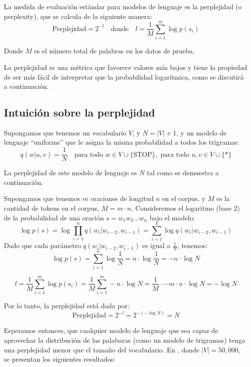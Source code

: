 \begin{definition}
La medida de evaluación estándar para modelos de lenguaje es la perplejidad (o perplexity), que se calcula de la siguiente manera:
\[
\text{Perplejidad} = 2^{-l} \quad \text{donde} \quad l = \frac{1}{M} \sum_{i=1}^{m} \log p(s_i)
\]

Donde $M$ es el número total de palabras en los datos de prueba. 
\end{definition}



La perplejidad es una métrica que favorece valores más bajos y tiene la propiedad de ser más fácil de interpretar que la probabilidad logarítmica, como se discutirá a continuación.


\subsection{Intuición sobre la perplejidad}

Supongamos que tenemos un vocabulario $V$, y $N = |V| + 1$, y un modelo de lenguaje ``uniforme'' que le asigna la misma probabilidad a todos los trigramas:
    \[
        q(w|u, v) = \frac{1}{N} \quad \text{para todo } w \in V \cup \{\text{STOP}\}, \text{ para todo } u, v \in V \cup \{*\}
    \]

La perplejidad de este modelo de lenguaje es $N$ tal como se demuestra a continuación.

Supongamos que tenemos $m$ oraciones de longitud $n$ en el corpus, y $M$ es la cantidad de tokens en el corpus, $M = m \cdot n$. Consideremos el logaritmo (base 2) de la probabilidad de una oración $s = w_1 w_2 \dots w_n$ bajo el modelo:
    \[
        \log p(s) = \log \prod_{i=1}^{n} q(w_i|w_{i-2}, w_{i-1}) = \sum_{i=1}^{n} \log q(w_i|w_{i-2}, w_{i-1})
    \]
Dado que cada parámetro $q(w_i|w_{i-2}, w_{i-1})$ es igual a $\frac{1}{N}$, tenemos:
    \[
        \log p(s) = \sum_{i=1}^{n} \log \frac{1}{N} = n \cdot \log \frac{1}{N} = -n \cdot \log N
    \]
    
    
    \[
        l =  \frac{1}{M} \sum_{i=1}^{m} \log p(s_i) = \frac{1}{M} \sum_{i=1}^{m} -n \cdot \log N  = \frac{1}{M} \cdot -m \cdot n \cdot \log N = - \log N 
    \]
    
            
Por lo tanto, la perplejidad está dada por:
    \[
        \text{Perplejidad} = 2^{-l} = 2^{-(- \log N)} = N
    \]

    
Esperamos entonces, que cualquier modelo de lenguaje que sea capaz de aprovechar la distribución de las palabaras (como un modelo de trigramas) tenga una perplejidad menor que el tamaño del vocabulario. En \cite{goodman2001bit}, donde $|V| = 50,000$, se presentan los siguientes resultados:

